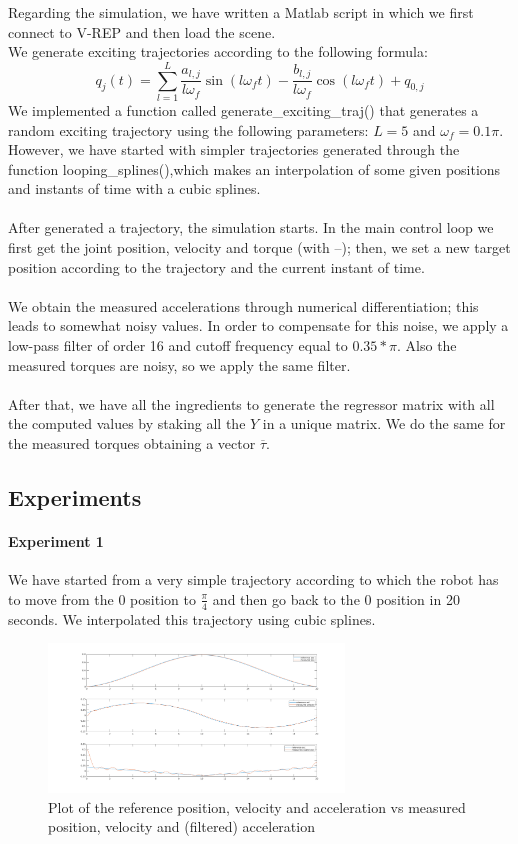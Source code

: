 \documentclass{article}
\begin{document}
\FloatBarrier
Regarding the simulation, we have written a Matlab script in which we first connect to V-REP and then load the scene.\\
We generate exciting trajectories according to the following formula:
\[q_j(t) = \sum_{l=1}^{L}{\frac{ a_{l,j}}{ l\omega_f }\sin(l\omega_f t)-\frac{ b_{l,j}}{l\omega_f}\cos(l\omega_f t)+q_{0,j}}\]
We implemented a function called generate\_exciting\_traj() that generates a random exciting trajectory using the following parameters: $L = 5$ and $\omega_f = 0.1\pi$.\\
However, we have started with simpler trajectories generated through the function looping\_splines(),which makes an interpolation of some given positions and instants of time with a cubic splines.
\\\\
After generated a trajectory, the simulation starts. In the main control loop we first get the joint position, velocity and torque (with –); then, we set a new target position according to the trajectory and the current instant of time.
\\\\
We obtain the measured accelerations through numerical differentiation; this leads to somewhat noisy values. In order to compensate for this noise, we apply a low-pass filter of order 16 and cutoff frequency equal to $0.35*\pi$. Also the measured torques are noisy, so we apply the same filter.
\paragraph{}After that, we have all the ingredients to generate the regressor matrix with all the computed values by staking all the $Y$ in a unique matrix. We do the same for the measured torques obtaining a vector $\overline{\tau}$.

\subsection{Experiments}
\paragraph{Experiment 1}We have started from a very simple trajectory according to which the robot has to move from the 0 position to $\frac{\pi}{4}$ and then go back to the 0 position in 20 seconds. We interpolated this trajectory using cubic splines.
\begin{figure}[!htbp]
\centering
\includegraphics[width=0.7\textwidth]{images/1-dof/new_experiment1_traj.png}
\caption{Plot of the reference position, velocity and acceleration vs measured position, velocity and (filtered) acceleration}
\end{figure}
\end{document}
